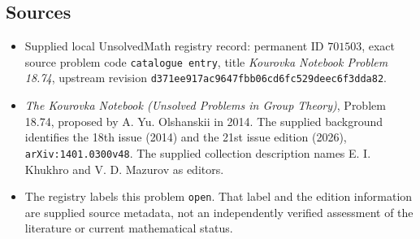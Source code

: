 \documentclass[11pt]{article}
\begin{document}
\subsection{Sources}
\begin{itemize}
\item Supplied local UnsolvedMath registry record: permanent ID \(701503\), exact source problem code \texttt{catalogue entry}, title \emph{Kourovka Notebook Problem 18.74}, upstream revision \texttt{d371ee917ac9647fbb06cd6fc529deec6f3dda82}.
\item \emph{The Kourovka Notebook (Unsolved Problems in Group Theory)}, Problem 18.74, proposed by A. Yu. Olshanskii in 2014. The supplied background identifies the 18th issue (2014) and the 21st issue edition (2026), \texttt{arXiv:1401.0300v48}. The supplied collection description names E. I. Khukhro and V. D. Mazurov as editors.
\item The registry labels this problem \texttt{open}. That label and the edition information are supplied source metadata, not an independently verified assessment of the literature or current mathematical status.
\end{itemize}
\end{document}
